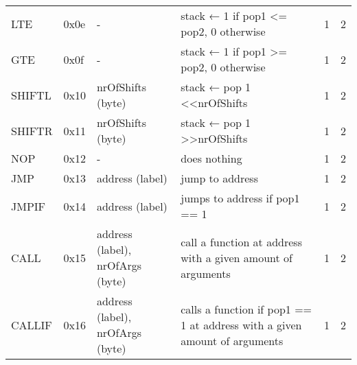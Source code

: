 \begin{longtable}[c]{L{2.5cm} L{1cm} L{3cm} L{5.5cm} R{0.8cm} R{1cm} }
LTE       & 0x0e   & -                                                                                                        & stack ← 1 if pop1 \textless{}= pop2, 0 otherwise                                                            & 1         & 2          \\
GTE       & 0x0f   & -                                                                                                        & stack ← 1 if pop1 \textgreater{}= pop2, 0 otherwise                                                         & 1         & 2          \\
SHIFTL    & 0x10   & nrOfShifts (byte)                                                                                        & stack ← pop 1 \textless{}\textless nrOfShifts                                                               & 1         & 2          \\
SHIFTR    & 0x11   & nrOfShifts (byte)                                                                                        & stack ← pop 1 \textgreater{}\textgreater nrOfShifts                                                         & 1         & 2          \\
NOP       & 0x12   & -                                                                                                        & does nothing                                                                                                & 1         & 2          \\
JMP       & 0x13   & address (label)                                                                                          & jump to address                                                                                             & 1         & 2          \\
JMPIF     & 0x14   & address (label)                                                                                          & jumps to address if pop1 == 1                                                                               & 1         & 2          \\
CALL      & 0x15   & address (label), nrOfArgs (byte)                                                                         & call a function at address with a given amount of arguments                                                 & 1         & 2          \\
CALLIF    & 0x16   & address (label), nrOfArgs (byte)                                                                         & calls a function if pop1 == 1 at address with a given amount of arguments                                   & 1         & 2          \\

\end{longtable}

